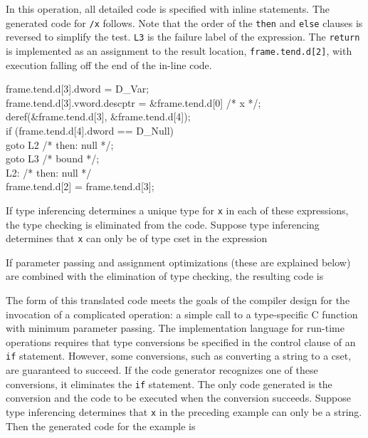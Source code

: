 \noindent
In this operation, all detailed code is specified with inline
statements. The generated code for \texttt{/x} follows. Note that the
order of the \texttt{then} and \texttt{else} clauses is reversed to
simplify the test. \texttt{L3} is the failure label of the expression.
The \texttt{return} is implemented as an assignment to the result
location, \texttt{frame.tend.d[2]}, with execution falling off the end
of the in-line code.

\goodbreak
\begin{iconcode}
\>\>frame.tend.d[3].dword = D\_Var;\\
\>\>frame.tend.d[3].vword.descptr = \&frame.tend.d[0] /* x */;\\
\>\>deref(\&frame.tend.d[3], \&frame.tend.d[4]);\\
\>\>if (frame.tend.d[4].dword == D\_Null)\\
\>\>\>goto L2 /* then: null */;\\
\>\>goto L3 /* bound */;\\
\>L2: /* then: null */\\
\>\>frame.tend.d[2] = frame.tend.d[3];\\
\end{iconcode}


If type inferencing determines a unique type for \texttt{x} in each of
these expressions, the type checking is eliminated from the code.
Suppose type inferencing determines that \texttt{x} can only be of type
cset in the expression


\noindent
If parameter passing and assignment optimizations (these are explained
below) are combined with the elimination of type checking, the
resulting code is


\noindent
The form of this translated code meets the goals of the compiler
design for the invocation of a complicated operation: a simple call to
a type-specific C function with minimum parameter passing. The
implementation language for run-time operations requires that type
conversions be specified in the control clause of an \texttt{if}
statement. However, some conversions, such as converting a string to a
cset, are guaranteed to succeed. If the code generator recognizes one
of these conversions, it eliminates the \texttt{if} statement. The
only code generated is the conversion and the code to be executed when
the conversion succeeds. Suppose type inferencing determines that
\texttt{x} in the preceding example can only be a string. Then the
generated code for the example is

